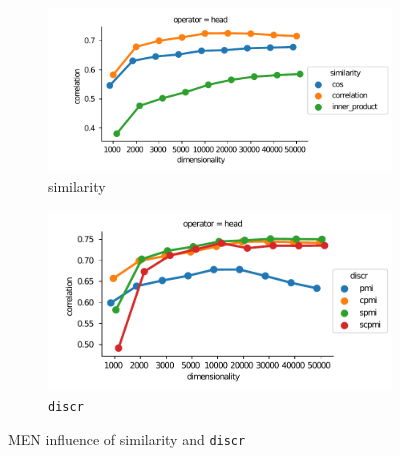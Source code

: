 \begin{figure}
  \centering
  \begin{subfigure}[t]{0.49\textwidth}
    \hspace{-20pt}
    \includegraphics[width=1.1\textwidth]{supplement/figures/men-interaction-similarity}

  \caption{similarity}
  \label{fig:men-similarity}
  \end{subfigure}
  \begin{subfigure}[t]{0.49\textwidth}
    \includegraphics[width=\textwidth]{supplement/figures/men-interaction-discr}

  \caption{\texttt{discr}}
  \label{fig:men-discr}
  \end{subfigure}

  \caption{MEN influence of similarity and \texttt{discr}}
\end{figure}
